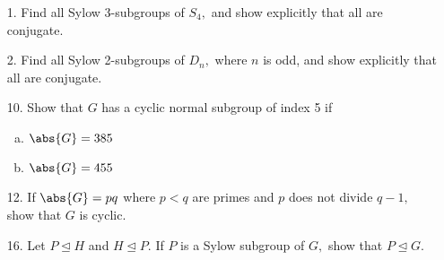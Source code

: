 \documentclass{article}
\begin{document}
\begin{itemize}
	\item[1.] Find all Sylow 3-subgroups of $S_4,$ and show explicitly that all are conjugate.

	\item[2.] Find all Sylow 2-subgroups of $D_n,$ where $n$ is odd, and show explicitly that all are conjugate.

	\item[10.] Show that $G$ has a cyclic normal subgroup of index 5 if
		\begin{enumerate}[(a)]
			\item $\abs{G}=385$

			\item $\abs{G}=455$
				
		\end{enumerate}

	\item[12.] If $\abs{G}=pq$ where $p<q$ are primes and $p$ does not divide $q-1,$ show that $G$ is cyclic.

	\item[16.] Let $P\unlhd H$ and $H\unlhd P.$ If $P$ is a Sylow subgroup of $G,$ show that $P\unlhd G.$
		
\end{itemize}
\end{document}
